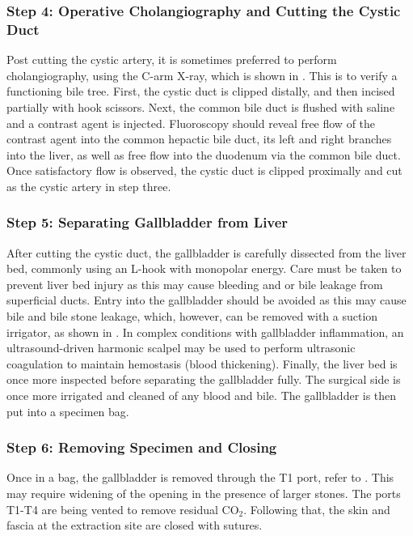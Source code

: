 \subsubsection{Step 4: Operative Cholangiography and Cutting the Cystic Duct} Post cutting the cystic artery, it is sometimes preferred to perform cholangiography, using the C-arm X-ray, which is shown in . This is to verify a functioning bile tree. First, the cystic duct is clipped distally, and then incised partially with hook scissors. Next, the common bile duct is flushed with saline and a contrast agent is injected. Fluoroscopy should reveal free flow of the contrast agent into the common hepactic bile duct, its left and right branches into the liver, as well as free flow into the duodenum via the common bile duct. Once satisfactory flow is observed, the cystic duct is clipped proximally and cut as the cystic artery in step three.


\subsubsection{Step 5: Separating Gallbladder from Liver} After cutting the cystic duct, the gallbladder is carefully dissected from the liver bed, commonly using an L-hook with monopolar energy. Care must be taken to prevent liver bed injury as this may cause bleeding and or bile leakage from superficial ducts. Entry into the gallbladder should be avoided as this may cause bile and bile stone leakage, which, however, can be removed with a suction irrigator, as shown in . In complex conditions with gallbladder inflammation, an ultrasound-driven harmonic scalpel may be used to perform ultrasonic coagulation to maintain hemostasis (blood thickening). Finally, the liver bed is once more inspected before separating the gallbladder fully. The surgical side is once more irrigated and cleaned of any blood and bile. The gallbladder is then put into a specimen bag.

\subsubsection{Step 6: Removing Specimen and Closing} Once in a bag, the gallbladder is removed through the T1 port, refer to . This may require widening of the opening in the presence of larger stones. The ports T1-T4 are being vented to remove residual $\text{CO}_2$. Following that, the skin and fascia at the extraction site are closed with sutures.


